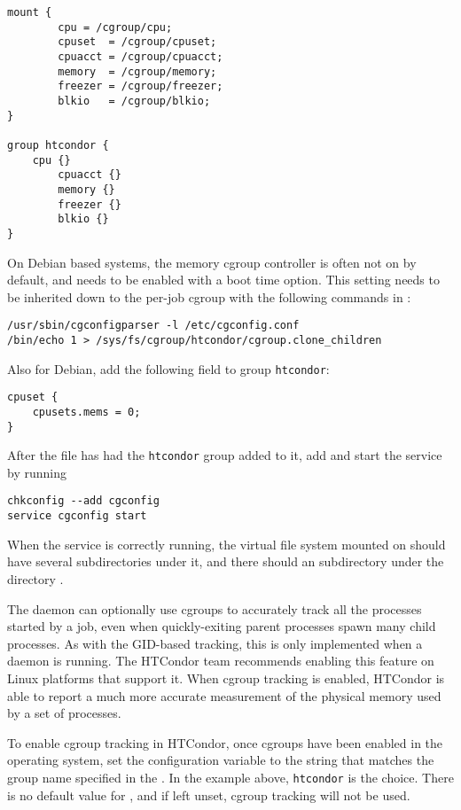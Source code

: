 \begin{verbatim}
mount {
        cpu	= /cgroup/cpu;
        cpuset	= /cgroup/cpuset;
        cpuacct = /cgroup/cpuacct;
        memory  = /cgroup/memory;
        freezer = /cgroup/freezer;
        blkio   = /cgroup/blkio;
}

group htcondor {
	cpu {}
        cpuacct {}
        memory {}
        freezer {}
        blkio {}
}
\end{verbatim}

On Debian based systems, the memory cgroup controller is often not 
on by default, and needs to be enabled with a boot time option.
This setting needs to be inherited
down to the per-job cgroup with the following commands in :

\begin{verbatim}
/usr/sbin/cgconfigparser -l /etc/cgconfig.conf
/bin/echo 1 > /sys/fs/cgroup/htcondor/cgroup.clone_children
\end{verbatim}

Also for Debian, add the following field to group \texttt{htcondor}:

\begin{verbatim}
cpuset {
	cpusets.mems = 0;
}
\end{verbatim}

After the  file has had the \texttt{htcondor} group
added to it, add and start the  service by running

\begin{verbatim}
chkconfig --add cgconfig
service cgconfig start
\end{verbatim}

When the  service is correctly running, 
the virtual file system
mounted on  should have several subdirectories under it, 
and there should an  subdirectory under the directory 
.

The  daemon can optionally use cgroups
to accurately track all the processes started by a job, 
even when quickly-exiting parent processes spawn many child processes.
As with the GID-based tracking, this is only implemented when a 
 daemon is running.  The HTCondor team recommends enabling 
this feature on Linux platforms that support it.  
When cgroup tracking is enabled, 
HTCondor is able to report a much more accurate
measurement of the physical memory used by a set of processes.

To enable cgroup tracking in HTCondor, once cgroups have been enabled
in the operating system, set the  configuration
variable to the string that matches the group name specified in 
the .
In the example above, \texttt{htcondor} is the choice.  
There is no default value for , 
and if left unset, cgroup tracking will not be used.

